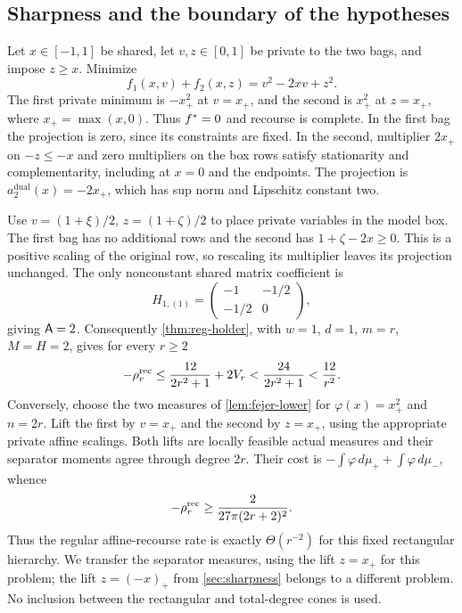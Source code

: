 \subsection{Sharpness and the boundary of the hypotheses}
\label{sec:reg-examples}

\begin{example}\label{ex:reg-sharp}
Let $x\in[-1,1]$ be shared, let $v,z\in[0,1]$ be private to the two bags,
and impose $z\ge x$. Minimize
\[
 f_1(x,v)+f_2(x,z)=v^2-2xv+z^2.
\]
The first private minimum is $-x_+^2$ at $v=x_+$, and the second is
$x_+^2$ at $z=x_+$, where $x_+=\max(x,0)$. Thus $f^{*}=0$ and recourse
is complete. In the first bag the projection is zero, since its
constraints are fixed. In the second, multiplier $2x_+$ on
$-z\le-x$ and zero multipliers on the box rows satisfy stationarity
and complementarity, including at $x=0$ and the endpoints. The projection
is $a_2^{\mathrm{dual}}(x)=-2x_+$, which has sup norm and Lipschitz
constant two.

Use $v=(1+\xi)/2$, $z=(1+\zeta)/2$ to place private variables in the
model box. The first bag has no additional rows and the second has
$1+\zeta-2x\ge0$. This is a positive scaling of the original row, so
rescaling its multiplier leaves its projection unchanged. The only
nonconstant shared matrix coefficient is
\[
 H_{1,(1)}=\begin{pmatrix}-1&-1/2\\-1/2&0\end{pmatrix},
\]
giving $\mathsf{A}=2$. Consequently \cref{thm:reg-holder}, with $w=1$,
$d=1$, $m=r$, $M=H=2$, gives for every $r\ge2$
\[
 -\rho^{\mathrm{rec}}_r\le\frac{12}{2r^2+1}+2V_r
       <\frac{24}{2r^2+1}<\frac{12}{r^2}.
\]
Conversely, choose the two measures of \cref{lem:fejer-lower} for
$\varphi(x)=x_+^2$ and $n=2r$. Lift the first by $v=x_+$ and the second
by $z=x_+$, using the appropriate private affine scalings. Both lifts
are locally feasible actual measures and their separator moments agree
through degree $2r$. Their cost is
$-\int\varphi\,d\mu_++\int\varphi\,d\mu_-$, whence
\[
 -\rho^{\mathrm{rec}}_r\ge\frac2{27\pi(2r+2)^2}.
\]
Thus the regular affine-recourse rate is exactly $\Theta(r^{-2})$ for
this fixed rectangular hierarchy. We transfer the separator measures,
using the lift $z=x_+$ for this problem; the lift $z=(-x)_+$ from
\cref{sec:sharpness} belongs to a different problem. No inclusion between
the rectangular and total-degree cones is used.
\end{example}


